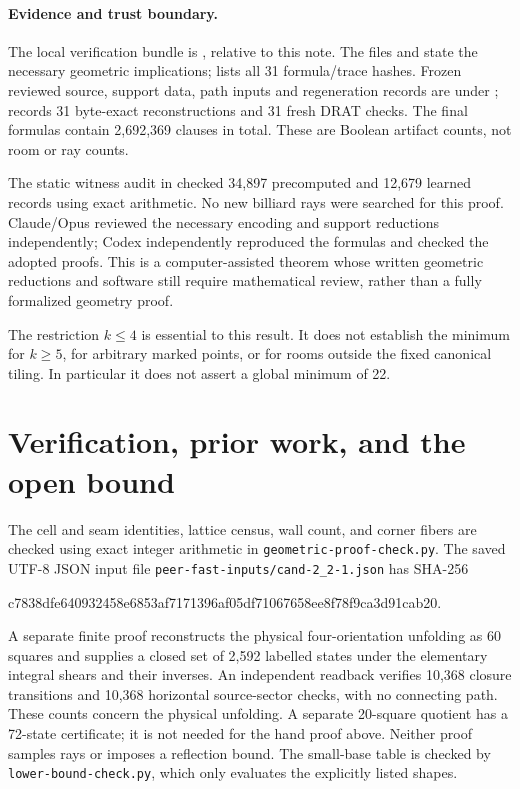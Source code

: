 \documentclass[11pt]{article}
\theoremstyle{definition}\newtheorem{definition}[theorem]{Definition}
\begin{document}
\paragraph{Evidence and trust boundary.}
The local verification bundle is , relative to this note. The files  and  state the necessary geometric implications;  lists all 31 formula/trace hashes. Frozen reviewed source, support data, path inputs and regeneration records are under ;  records 31 byte-exact reconstructions and 31 fresh DRAT checks. The final formulas contain 2,692,369 clauses in total. These are Boolean artifact counts, not room or ray counts.

The static witness audit in  checked 34,897 precomputed and 12,679 learned records using exact arithmetic. No new billiard rays were searched for this proof. Claude/Opus reviewed the necessary encoding and support reductions independently; Codex independently reproduced the formulas and checked the adopted proofs. This is a computer-assisted theorem whose written geometric reductions and software still require mathematical review, rather than a fully formalized geometry proof.

The restriction $k\le4$ is essential to this result. It does not establish the minimum for $k\ge5$, for arbitrary marked points, or for rooms outside the fixed canonical tiling. In particular it does not assert a global minimum of 22.

\section{Verification, prior work, and the open bound}
The cell and seam identities, lattice census, wall count, and corner fibers are checked using exact integer arithmetic in \texttt{geometric-proof-check.py}. The saved UTF-8 JSON input file \texttt{peer-fast-inputs/cand-2\_2-1.json} has SHA-256
\begin{center}\scriptsize\ttfamily
c7838dfe640932458e6853af7171396af05df71067658ee8f78f9ca3d91cab20.
\end{center}
A separate finite proof reconstructs the physical four-orientation unfolding as 60 squares and supplies a closed set of 2,592 labelled states under the elementary integral shears and their inverses. An independent readback verifies 10,368 closure transitions and 10,368 horizontal source-sector checks, with no connecting path. These counts concern the physical unfolding. A separate 20-square quotient has a 72-state certificate; it is not needed for the hand proof above. Neither proof samples rays or imposes a reflection bound. The small-base table is checked by \texttt{lower-bound-check.py}, which only evaluates the explicitly listed shapes.
\end{document}
